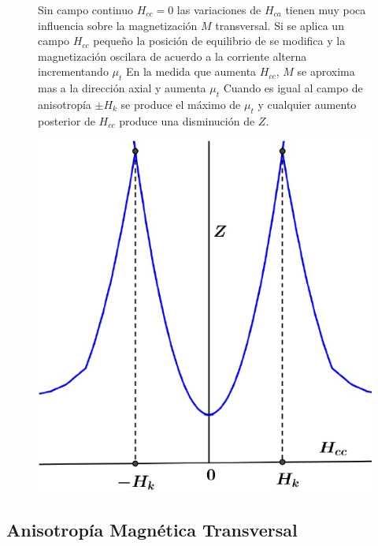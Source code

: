 \begin{figure}[H]
  \begin{minipage}[b]{0.47\textwidth}
Sin campo continuo $H_{cc}=0$ las variaciones de $H_{ca}$ tienen muy poca influencia sobre la magnetización $M$ transversal. Si se aplica un campo $H_{cc}$ pequeño la posición de equilibrio de se modifica y la magnetización oscilara de acuerdo a la corriente alterna incrementando $\mu_{t}$ En la medida que aumenta $H_{cc}$, $M$ se
aproxima mas a la dirección axial y aumenta $\mu_{t}$ Cuando es igual al campo de anisotropía $\pm H_{k}$ se produce el máximo de $\mu_{t}$ y cualquier aumento posterior de $H_{cc}$ produce una disminución de $Z$.
  \vspace{1.0cm}
  \end{minipage}
  \hfill
  \begin{minipage}[b]{0.47\textwidth}
     \includegraphics[width=1.0\textwidth]{./Figures/fig325}
	\label{fig:325}
	  \vspace{0.0cm}
  \end{minipage}
\end{figure}

\subsection{Anisotropía Magnética Transversal}

